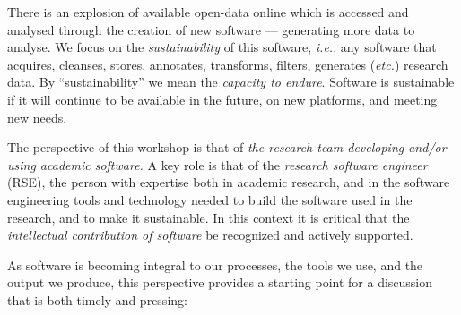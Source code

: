 \documentclass[a4paper,UKenglish]{dagman}
\newcommand{\ie}{\emph{i.e.},\xspace}
\newcommand{\etc}{\emph{etc.}\xspace}
\begin{document}
There is an explosion of available open-data online which is accessed and analysed through the creation of new software --- generating more data to analyse. We focus on the \emph{sustainability} of this software, \ie any software that acquires, cleanses, stores, annotates, transforms, filters, generates (\etc) research data.
By ``sustainability'' we mean the \emph{capacity to endure}. Software is sustainable if it will continue to be available in the future, on new platforms, and meeting new needs.  


The perspective of this workshop is that of \emph{the research team developing and/or using academic software.} 
A key role is that of the \emph{research software engineer} (RSE), the person with expertise both in academic research, and in the software engineering tools and technology needed to build the software used in the research, and to make it sustainable. 
In this context it is critical that the \emph{intellectual contribution of software} be recognized and actively supported.

As software is becoming integral to our processes, the tools we use, and the output we produce, this perspective provides a starting point for a discussion that is both timely and pressing:
\end{document}
